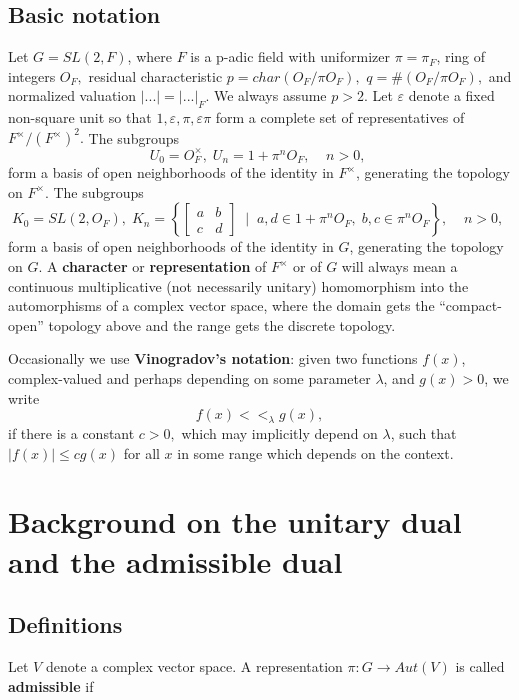 \subsection{Basic notation}

Let $G=SL(2,F)$, where $F$ is a p-adic field with uniformizer $\pi =\pi _F$,
ring of integers $O_F,$ residual characteristic $p=char(O_F/\pi O_F),$ $%
q=\#(O_F/\pi O_F),$ and normalized valuation $|...|=|...|_F.$ We always
assume $p>2.$ Let $\varepsilon $ denote a fixed non-square unit so that $%
1,\varepsilon ,\pi ,\varepsilon \pi $ form a complete set of representatives
of $F^{\times }/(F^{\times })^2.$ The subgroups 
\[
U_0=O_F^{\times },\;U_n=1+\pi ^nO_F,\;\;\;\;n>0,\; 
\]
form a basis of open neighborhoods of the identity in $F^{\times }$,
generating the topology on $F^{\times }$. The subgroups 
\[
K_0=SL(2,O_F),\;K_n=\left\{ \left[ 
\begin{array}{cc}
a & b \\ 
c & d
\end{array}
\right] \;\;|\;\;a,d\in 1+\pi ^nO_F,\;b,c\in \pi ^nO_F\right\}
,\;\;\;\;n>0,\; 
\]
form a basis of open neighborhoods of the identity in $G$, generating the
topology on $G$. A {\bf character} or {\bf representation} of $F^{\times }$
or of $G$ will always mean a continuous multiplicative (not necessarily
unitary) homomorphism into the automorphisms of a complex vector space,
where the domain gets the ``compact-open'' topology above and the range gets
the discrete topology.

Occasionally we use {\bf Vinogradov's notation}: given two functions $f(x)$,
complex-valued and perhaps depending on some parameter $\lambda $, and $%
g(x)>0$, we write 
\[
f(x)<<_\lambda g(x), 
\]
if there is a constant $c>0,$ which may implicitly depend on $\lambda $,
such that $|f(x)|\leq cg(x)$ for all $x$ in some range which depends on the
context.

\section{Background on the unitary dual and the admissible dual}

\subsection{Definitions}

Let $V$ denote a complex vector space. A representation $\pi :G\rightarrow
Aut(V)$ is called {\bf admissible} if


